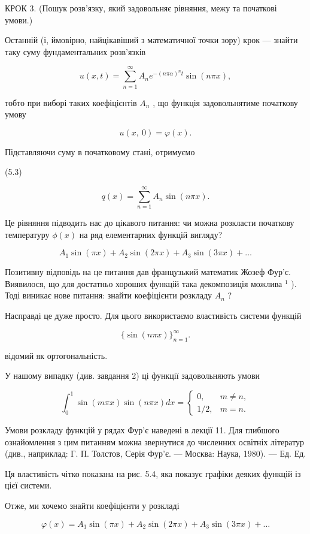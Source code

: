 КРОК 3. (Пошук розв'язку, який задовольняє рівняння, межу та початкові умови.)

Останній (і, ймовірно, найцікавіший з математичної точки зору) крок --- знайти таку суму фундаментальних розв'язків

\[u(x, t) = \sum_{n=1}^{\infty} A_n e^{-(n\pi\alpha)^n t} \sin(n\pi x),\]

тобто при виборі таких коефіцієнтів \(A_n\) , що функція задовольнятиме початкову умову

\[u\left( x,\ 0\right) =\varphi\left( x\right) .\]

Підставляючи суму в початковому стані, отримуємо

(5.3)

\[q(x) = \sum_{n=1}^{\infty} A_n \sin(n\pi x).\]

Це рівняння підводить нас до цікавого питання: чи можна розкласти початкову температуру \(\phi(x)\) на ряд елементарних функцій вигляду?

\[A_1 \sin(\pi x) + A_2 \sin(2\pi x) + A_3 \sin(3\pi x) + \dots\]

Позитивну відповідь на це питання дав французький математик Жозеф Фур'є. Виявилося, що для достатньо хороших функцій така декомпозиція можлива \(^1\) ). Тоді виникає нове питання: знайти коефіцієнти розкладу \(A_n\) ?

Насправді це дуже просто. Для цього використаємо властивість системи функцій

\[\{\sin(n\pi x)\}_{n=1}^{\infty}.\]

відомий як ортогональність.

У нашому випадку (див. завдання 2) ці функції задовольняють умови

\[\int_{0}^{1} \sin(m\pi x) \sin(n\pi x) dx = \begin{cases} 0, & m \neq n, \\ 1/2, & m = n. \end{cases}\]

Умови розкладу функцій у рядах Фур'є наведені в лекції 11. Для глибшого ознайомлення з цим питанням можна звернутися до численних освітніх літератур (див., наприклад: Г. П. Толстов, Серія Фур'є. --- Москва: Наука, 1980). --- Ед. Ед.

Ця властивість чітко показана на рис. 5.4, яка показує графіки деяких функцій із цієї системи.

Отже, ми хочемо знайти коефіцієнти у розкладі

\[\varphi(x) = A_1 \sin(\pi x) + A_2 \sin(2\pi x) + A_3 \sin(3\pi x) + \dots\]


